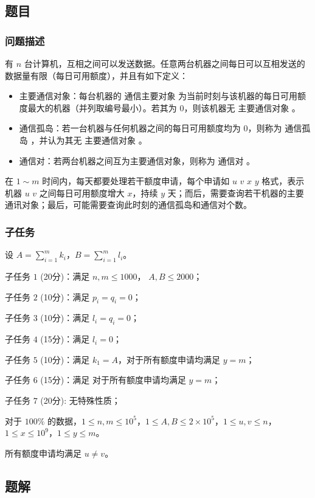\documentclass[UTF8, 12pt, a4paper, oneside]{ctexart}
\begin{document}
\subsection{题目}
\subsubsection{问题描述}
\par 有 $n$ 台计算机，互相之间可以发送数据。任意两台机器之间每日可以互相发送的数据量有限（每日可用额度），并且有如下定义：
\begin{itemize}
    \item 主要通信对象：每台机器的 通信主要对象 为当前时刻与该机器的每日可用额度最大的机器（并列取编号最小）。若其为 $0$，则该机器无 主要通信对象 。
    \item 通信孤岛：若一台机器与任何机器之间的每日可用额度均为 $0$，则称为 通信孤岛 ，并认为其无 主要通信对象 。
    \item 通信对：若两台机器之间互为主要通信对象，则称为 通信对 。
\end{itemize}
\par 在 $1 \sim m$ 时间内，每天都要处理若干额度申请，每个申请如 $u$ $v$ $x$ $y$ 格式，表示机器 $u$ $v$ 之间每日可用额度增大 $x$，持续 $y$ 天；而后，需要查询若干机器的主要通讯对象；最后，可能需要查询此时刻的通信孤岛和通信对个数。
\subsubsection{子任务}
\par 设 $A=\sum_{i = 1}^{m}k_i$，$B=\sum_{i = 1}^{m}l_i$。
\par 子任务 $1$ (20分)：满足 $n,m \leq 1000$， $A,B \leq 2000$；
\par 子任务 $2$ (10分)：满足 $p_i = q_i = 0$；
\par 子任务 $3$ (10分)：满足 $l_i = q_i = 0$；
\par 子任务 $4$ (15分)：满足 $l_i = 0$；
\par 子任务 $5$ (10分)：满足 $k_1 = A$，对于所有额度申请均满足 $y = m$；
\par 子任务 $6$ (15分)：满足 对于所有额度申请均满足 $y = m$；
\par 子任务 $7$ (20分): 无特殊性质；
\par 对于 $100\%$ 的数据，$1 \leq n,m \leq 10^5$，$1 \leq A,B \leq 2\times 10^5$，$1 \leq u,v \leq n$，$1 \leq x \leq 10^9$，$1 \leq y \leq m$。
\par 所有额度申请均满足 $u \neq v$。
\subsection{题解}
\end{document}
